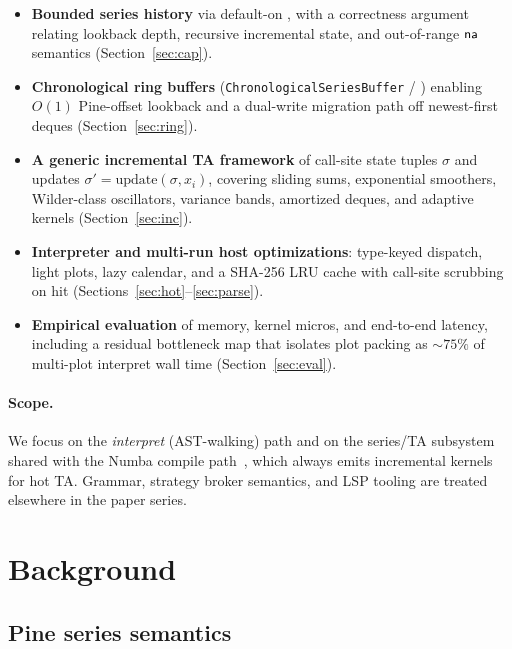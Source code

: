 \documentclass[11pt,a4paper]{article}
\begin{document}
\begin{itemize}[leftmargin=*]
  \item \textbf{Bounded series history} via default-on ,
        with a correctness argument relating lookback depth, recursive
        incremental state, and out-of-range $\textsf{na}$ semantics
        (Section~\ref{sec:cap}).
  \item \textbf{Chronological ring buffers}
        (\texttt{ChronologicalSeriesBuffer} /
        ) enabling $O(1)$ Pine-offset lookback and a
        dual-write migration path off newest-first deques
        (Section~\ref{sec:ring}).
  \item \textbf{A generic incremental TA framework} of call-site state tuples
        $\sigma$ and updates $\sigma'=\mathrm{update}(\sigma,x_i)$, covering
        sliding sums, exponential smoothers, Wilder-class oscillators, variance
        bands, amortized deques, and adaptive kernels
        (Section~\ref{sec:inc}).
  \item \textbf{Interpreter and multi-run host optimizations}: type-keyed
        dispatch, light plots, lazy calendar, and a SHA-256 LRU \ast{} cache
        with call-site scrubbing on hit (Sections~\ref{sec:hot}--\ref{sec:parse}).
  \item \textbf{Empirical evaluation} of memory, kernel micros, and end-to-end
        latency, including a residual bottleneck map that isolates plot packing
        as $\sim 75\%$ of multi-plot interpret wall time
        (Section~\ref{sec:eval}).
\end{itemize}

\paragraph{Scope.}
We focus on the \emph{interpret} (AST-walking) path and on the series/TA
subsystem shared with the Numba compile path~\citep{lam2015numba}, which always
emits incremental kernels for hot TA.  Grammar, strategy broker semantics, and
LSP tooling are treated elsewhere in the \pyne{} paper series.

\section{Background}
\label{sec:bg}

\subsection{Pine series semantics}
\label{sec:bg-series}
\end{document}
